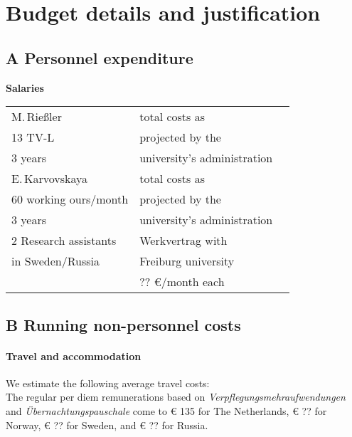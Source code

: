 \documentclass[a4paper,12pt]{article}
\begin{document}
\section{Budget details and justification}
\subsection*{A Personnel expenditure}
\noindent \textbf{Salaries}\\
\begin{longtable}{| l | l | r |}
\hline
M.\,Rießler&total costs as&\\
13 TV-L&projected by the&\\
3 years&university's administration&\\
\hline
E.\,Karvovskaya&total costs as&\\
60 working ours/month& projected by the&\\
3 years&university's administration&\\
\hline
2 Research assistants&Werkvertrag with&\\
in Sweden/Russia&Freiburg university&\\
&?? €/month each&\\
\hline
\end{longtable}

\subsection*{B Running non-personnel costs}
\paragraph{Travel and accommodation}
We estimate the following average travel costs:\\

\noindent The regular per diem remunerations based on \textit{Verpflegungsmehraufwendungen} and \textit{Übernachtungspauschale} come to € 135 for The Netherlands, € ?? for Norway, € ?? for Sweden, and € ?? for Russia.
\end{document}
